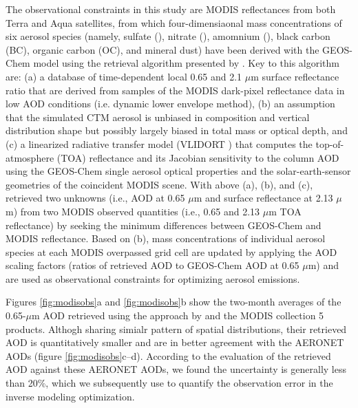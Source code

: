  The observational constraints in this study are 
 MODIS reflectances from both Terra and Aqua satellites, 
 from which four-dimensiaonal mass concentrations of six aerosol species 
 (namely, sulfate (), nitrate (), amomnium (), black carbon (BC), 
 organic carbon (OC), and mineral dust) have been derived 
 with the GEOS-Chem model using the retrieval algorithm presented by \citet{wang10}. 
 Key to this algorithm are: 
 (a) a database of time-dependent local 0.65 and 2.1 $\mu$m surface reflectance ratio 
 that are derived from samples of the MODIS dark-pixel reflectance data in low AOD conditions 
 (i.e. dynamic lower envelope method), 
 (b) an assumption that the simulated CTM aerosol is unbiased 
 in composition and vertical distribution shape but possibly largely biased 
 in total mass or optical depth, 
 and (c) a linearized radiative transfer model (VLIDORT \citep{spurr06}) 
 that computes the top-of-atmosphere (TOA) reflectance 
 and its Jacobian sensitivity to the column AOD using 
 the GEOS-Chem single aerosol optical properties 
 and the solar-earth-sensor geometries of the coincident MODIS scene. 
 With above (a), (b), and (c), \citet{wang10} retrieved two unknowns
 (i.e., AOD at 0.65 $\mu$m and surface reflectance at 2.13 $\mu$m)
 from two MODIS observed quantities (i.e., 0.65 and 2.13 $\mu$m TOA reflectance) 
 by seeking the minimum differences between GEOS-Chem and MODIS reflectance. 
 Based on (b), mass concentrations of individual aerosol species 
 at each MODIS overpassed grid cell are updated by applying the AOD scaling factors 
 (ratios of retrieved AOD to GEOS-Chem AOD at 0.65 $\mu$m) 
 and are used as observational constraints for optimizing aerosol emissions. 

 Figures \ref{fig:modisobs}a and \ref{fig:modisobs}b show the two-month averages of the 0.65-$\mu$m AOD
 retrieved using the approach by \citet{wang10} and the MODIS collection 5 products. 
 Althogh sharing simialr pattern of spatial distributions, their retrieved AOD is quantitatively smaller
 and are in better agreement with the AERONET AODs (figure \ref{fig:modisobs}c--d). 
 According to the evaluation of the retrieved AOD against these AERONET AODs, 
 we found the uncertainty is generally less than 20\%, 
 which we subsequently use to quantify the observation error 
 in the inverse modeling optimization. 

